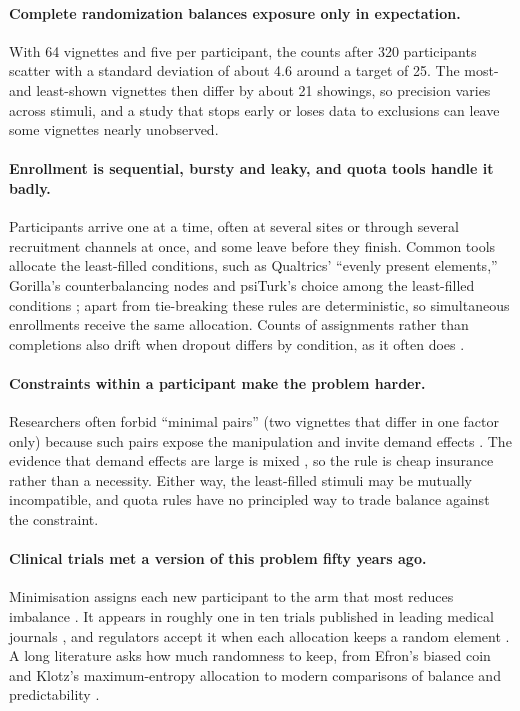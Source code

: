 \documentclass[11pt]{article}
\begin{document}
\paragraph{Complete randomization balances exposure only in expectation.} With 64 vignettes and five per participant, the counts after 320 participants scatter with a standard deviation of about 4.6 around a target of 25. The most- and least-shown vignettes then differ by about 21 showings, so precision varies across stimuli, and a study that stops early or loses data to exclusions can leave some vignettes nearly unobserved.

\paragraph{Enrollment is sequential, bursty and leaky, and quota tools handle it badly.} Participants arrive one at a time, often at several sites or through several recruitment channels at once, and some leave before they finish. Common tools allocate the least-filled conditions, such as Qualtrics' ``evenly present elements,'' Gorilla's counterbalancing nodes and psiTurk's choice among the least-filled conditions \citep{gureckis2016}; apart from tie-breaking these rules are deterministic, so simultaneous enrollments receive the same allocation. Counts of assignments rather than completions also drift when dropout differs by condition, as it often does \citep{zhou2016,bell2013}.

\paragraph{Constraints within a participant make the problem harder.} Researchers often forbid ``minimal pairs'' (two vignettes that differ in one factor only) because such pairs expose the manipulation and invite demand effects \citep{charness2012,horiuchi2022}. The evidence that demand effects are large is mixed \citep{mummolo2019,clifford2021}, so the rule is cheap insurance rather than a necessity. Either way, the least-filled stimuli may be mutually incompatible, and quota rules have no principled way to trade balance against the constraint.

\paragraph{Clinical trials met a version of this problem fifty years ago.} Minimisation assigns each new participant to the arm that most reduces imbalance \citep{taves1974,pocock1975,altman2005}. It appears in roughly one in ten trials published in leading medical journals \citep{kahan2012,ciolino2019}, and regulators accept it when each allocation keeps a random element \citep{ich1998,ema2015}. A long literature asks how much randomness to keep, from Efron's biased coin \citep{efron1971} and Klotz's maximum-entropy allocation \citep{klotz1978} to modern comparisons of balance and predictability \citep{atkinson2014}.
\end{document}
